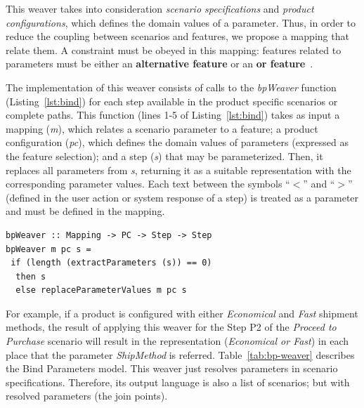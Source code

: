 \documentclass{report}
\begin{document}
\begin{frontmatter}
{This weaver takes into consideration \emph{scenario specifications} and 
\emph{product configurations}, which defines the domain values of a
parameter. Thus, in order to reduce the coupling between scenarios and features, 
we propose a mapping that relate them. A constraint must be obeyed in this mapping: features related to parameters must be either an {\bf alternative feature} or an {\bf or feature}~\cite{gheyi-alloy-06,czarnecki-wsfactory-2005,czarnecki-book}.

The implementation of this weaver consists of calls to 
the \mbox{\emph{bpWeaver}} function (Listing~\ref{lst:bind}) for each step 
available in the product specific scenarios or complete paths. This
function (lines 1-5 of Listing~\ref{lst:bind}) takes as
input a mapping (\emph{m}), which relates a scenario parameter to a 
feature; a product configuration (\emph{pc}), which defines 
the domain values of parameters (expressed as the feature selection); and a step (\emph{s}) that may be parameterized. Then, it replaces all parameters
from \emph{s}, returning it as a suitable representation with the
corresponding parameter values. Each text between the symbols ``$<$'' and ``$>$''
(defined in the user action or system response of a
step) is treated as a parameter and must be defined in the
mapping.

\begin{lstlisting}[belowskip=10pt,frame=tb,caption={Bind parameter weaver function},label=lst:bind]
bpWeaver :: Mapping -> PC -> Step -> Step
bpWeaver m pc s =
 if (length (extractParameters (s)) == 0)
  then s
  else replaceParameterValues m pc s
\end{lstlisting}

For example, if a product is configured with either \emph{Economical} and 
\emph{Fast} shipment methods, the result of applying this weaver for 
the Step P2 of the \emph{Proceed to Purchase} scenario will result in the 
representation (\emph{Economical or Fast}) in each place that the parameter \emph{ShipMethod} is referred.
Table~\ref{tab:bp-weaver} describes the Bind Parameters model. This weaver just resolves parameters in scenario specifications. Therefore, its output language is also a list of scenarios; but with resolved parameters (the join points). 

}
\end{frontmatter}
\end{document}
